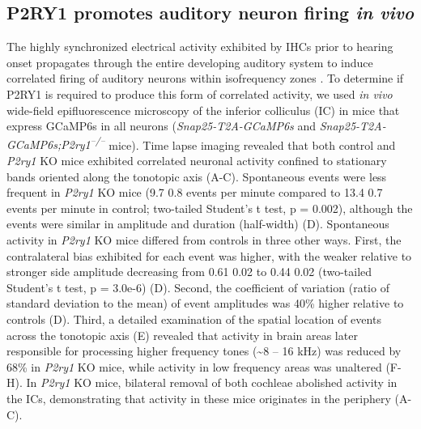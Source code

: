 \documentclass[9pt,lineno]{elife}
\begin{document}
\subsection{P2RY1 promotes auditory neuron firing \textit{\textit{\textit{in vivo}}}}
The highly synchronized electrical activity exhibited by IHCs prior to hearing onset propagates through the entire developing auditory system to induce correlated firing of auditory neurons within isofrequency zones \citep{Babola2018,Tritsch2010a}. To determine if P2RY1 is required to produce this form of correlated activity, we used \textit{in vivo} wide-field epifluorescence microscopy of the inferior colliculus (IC) in mice that express GCaMP6s in all neurons (\textit{Snap25-T2A-GCaMP6s} and \textit{Snap25-T2A-GCaMP6s;P2ry1\textsuperscript{–/–}} mice). Time lapse imaging revealed that both control and \textit{P2ry1} KO mice exhibited correlated neuronal activity confined to stationary bands oriented along the tonotopic axis (A-C). Spontaneous events were less frequent in \textit{P2ry1} KO mice (9.7 \textpm \hspace{0.2 mm} 0.8 events per minute compared to 13.4 \textpm \hspace{0.2 mm} 0.7 events per minute in control; two-tailed Student’s t test, p = 0.002), although the events were similar in amplitude and duration (half-width) (D). Spontaneous activity in \textit{P2ry1} KO mice differed from controls in three other ways. First, the contralateral bias exhibited for each event was higher, with the weaker relative to stronger side amplitude decreasing from 0.61 \textpm \hspace{0.2 mm} 0.02 to 0.44 \textpm \hspace{0.2 mm} 0.02  (two-tailed Student’s t test, p = 3.0e-6) (D). Second, the coefficient of variation (ratio of standard deviation to the mean) of event amplitudes was 40\% higher relative to controls (D). Third, a detailed examination of the spatial location of events across the tonotopic axis (E) revealed that activity in brain areas later responsible for processing higher frequency tones (\textasciitilde 8 -- 16 kHz) was reduced by 68\% in \textit{P2ry1} KO mice, while activity in low frequency areas was unaltered (F-H). In \textit{P2ry1} KO mice, bilateral removal of both cochleae abolished activity in the ICs, demonstrating that activity in these mice originates in the periphery (A-C).
\end{document}
